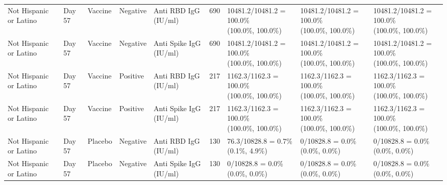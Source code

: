 \documentclass[]{book}
\theoremstyle{definition}
\theoremstyle{definition}
\theoremstyle{definition}
\newcommand{\1}{\mathbbm{1}}
\begin{document}
\begin{landscape}
\begin{ThreePartTable}
\begin{longtable}[t]{>{\raggedright\arraybackslash}p{2.7cm}llllllll}
\hspace{1em}Not Hispanic or Latino & Day 57 & Vaccine & Negative & Anti RBD IgG (IU/ml) & 690 & \makecell[l]{10481.2/10481.2 = 100.0\%\\(100.0\%, 100.0\%)} & \makecell[l]{10481.2/10481.2 = 100.0\%\\(100.0\%, 100.0\%)} & \makecell[l]{10481.2/10481.2 = 100.0\%\\(100.0\%, 100.0\%)}\\
\hspace{1em}Not Hispanic or Latino & Day 57 & Vaccine & Negative & Anti Spike IgG (IU/ml) & 690 & \makecell[l]{10481.2/10481.2 = 100.0\%\\(100.0\%, 100.0\%)} & \makecell[l]{10481.2/10481.2 = 100.0\%\\(100.0\%, 100.0\%)} & \makecell[l]{10481.2/10481.2 = 100.0\%\\(100.0\%, 100.0\%)}\\
\hspace{1em}Not Hispanic or Latino & Day 57 & Vaccine & Positive & Anti RBD IgG (IU/ml) & 217 & \makecell[l]{1162.3/1162.3 = 100.0\%\\(100.0\%, 100.0\%)} & \makecell[l]{1162.3/1162.3 = 100.0\%\\(100.0\%, 100.0\%)} & \makecell[l]{1162.3/1162.3 = 100.0\%\\(100.0\%, 100.0\%)}\\
\hspace{1em}Not Hispanic or Latino & Day 57 & Vaccine & Positive & Anti Spike IgG (IU/ml) & 217 & \makecell[l]{1162.3/1162.3 = 100.0\%\\(100.0\%, 100.0\%)} & \makecell[l]{1162.3/1162.3 = 100.0\%\\(100.0\%, 100.0\%)} & \makecell[l]{1162.3/1162.3 = 100.0\%\\(100.0\%, 100.0\%)}\\
\hspace{1em}Not Hispanic or Latino & Day 57 & Placebo & Negative & Anti RBD IgG (IU/ml) & 130 & \makecell[l]{76.3/10828.8 = 0.7\%\\(0.1\%, 4.9\%)} & \makecell[l]{0/10828.8 = 0.0\%\\(0.0\%, 0.0\%)} & \makecell[l]{0/10828.8 = 0.0\%\\(0.0\%, 0.0\%)}\\
\hspace{1em}Not Hispanic or Latino & Day 57 & Placebo & Negative & Anti Spike IgG (IU/ml) & 130 & \makecell[l]{0/10828.8 = 0.0\%\\(0.0\%, 0.0\%)} & \makecell[l]{0/10828.8 = 0.0\%\\(0.0\%, 0.0\%)} & \makecell[l]{0/10828.8 = 0.0\%\\(0.0\%, 0.0\%)}\\

\end{longtable}
\end{ThreePartTable}
\end{landscape}
\end{document}
